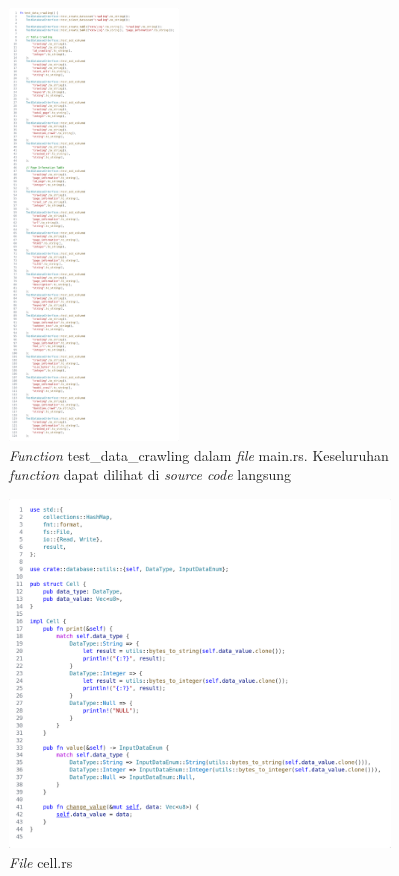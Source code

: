 \begin{figure}[H]
  \centering{}
	\includegraphics[width=0.4\textwidth]{gambar/lampiran/file-main-test-data-1.png}
  \caption{\emph{Function} test\_data\_crawling dalam \emph{file} main.rs. Keseluruhan \emph{function} dapat dilihat di \emph{source code} langsung}
\end{figure}


\begin{figure}[H]
  \centering{}
	\includegraphics[width=0.9\textwidth]{gambar/lampiran/file-cell.png}
  \caption{\emph{File} cell.rs}
\end{figure}

